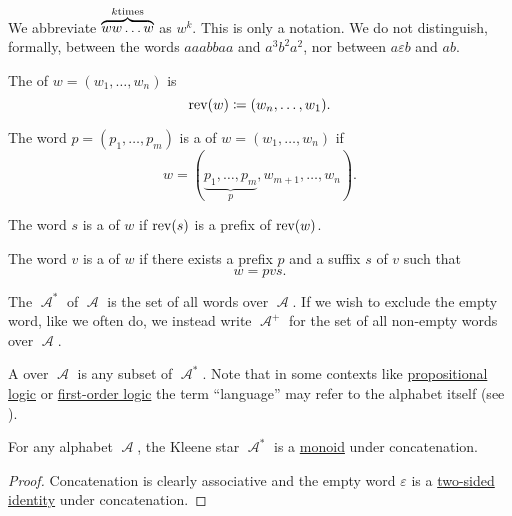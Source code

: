 \begin{definition}
\begin{thmenum}
    We abbreviate \( \overbrace{w w \ldots w}^{k \T{times}} \) as \( w^k \). This is only a notation. We do not distinguish, formally, between the words \( aaabbaa \) and \( a^3 b^2 a^2 \), nor between \( a \varepsilon b \) and \( ab \).

     The  of \( w = (w_1, \ldots, w_n) \) is
    \begin{equation*}
      \operatorname{rev}(w) \coloneqq (w_n, \ldots, w_1).
    \end{equation*}

     The word \( p = (p_1, \ldots, p_m) \) is a  of \( w = (w_1, \ldots, w_n) \) if
    \begin{equation*}
      w = (\underbrace{p_1, \ldots, p_m}_p, w_{m+1}, \ldots, w_n).
    \end{equation*}

     The word \( s \) is a  of \( w \) if \( \operatorname{rev}(s) \) is a prefix of \( \operatorname{rev}(w) \).

     The word \( v \) is a  of \( w \) if there exists a prefix \( p \) and a suffix \( s \) of \( v \) such that
    \begin{equation*}
      w = pvs.
    \end{equation*}

     The  \( \mscrA^* \) of \( \mscrA \) is the set of all words over \( \mscrA \). If we wish to exclude the empty word, like we often do, we instead write \( \mscrA^+ \) for the set of all non-empty words over \( \mscrA \).

     A  over \( \mscrA \) is any subset of \( \mscrA^* \). Note that in some contexts like \hyperref[subsec:propositional_logic]{propositional logic} or \hyperref[subsec:first_order_logic]{first-order logic} the term \enquote{language} may refer to the alphabet itself (see ).
  \end{thmenum}
\end{definition}

\begin{proposition}\label{thm:kleene_star_is_monoid}
  For any alphabet \( \mscrA \), the Kleene star \( \mscrA^* \) is a \hyperref[def:unital_magma/monoid]{monoid} under concatenation.
\end{proposition}
\begin{proof}
  Concatenation is clearly associative and the empty word \( \varepsilon \) is a \hyperref[def:magma_identity]{two-sided identity} under concatenation.
\end{proof}

